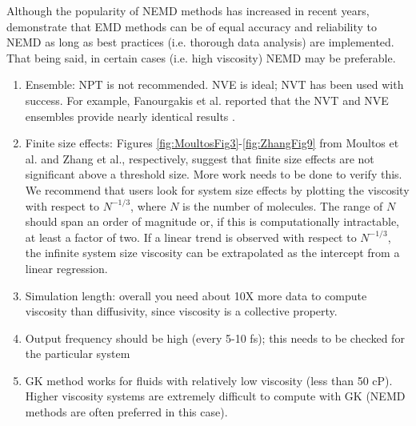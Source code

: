 \documentclass[9pt]{livecoms}
\begin{document}

Although the popularity of NEMD methods has increased in recent years, \cite{Chen2009} demonstrate that EMD methods can be of equal accuracy and reliability to NEMD as long as best practices (i.e. thorough data analysis) are implemented. That being said, in certain cases (i.e. high viscosity) NEMD may be preferable.

\begin{enumerate}
	\item Ensemble: NPT is not recommended. NVE is ideal; NVT has been used with success. For example, Fanourgakis et al. reported that the NVT and NVE ensembles provide nearly identical results \cite{Fanourgakis2012}.
	\item Finite size effects: Figures \ref{fig:MoultosFig3}-\ref{fig:ZhangFig9} from Moultos et al. and Zhang et al., respectively, suggest that finite size effects are not significant above a threshold size. More work needs to be done to verify this. We recommend that users look for system size effects by plotting the viscosity with respect to $N^{-1/3}$, where $N$ is the number of molecules. The range of $N$ should span an order of magnitude or, if this is computationally intractable, at least a factor of two. If a linear trend is observed with respect to $N^{-1/3}$, the infinite system size viscosity can be extrapolated as the intercept from a linear regression.
	\item Simulation length: overall you need about 10X more data to compute viscosity than diffusivity, since viscosity is a collective property.
	\item Output frequency should be high (every 5-10 fs); this needs to be checked for the particular system 
	\item GK method works for fluids with relatively low viscosity (less than 50 cP). Higher viscosity systems are extremely difficult to compute with GK (NEMD methods are often preferred in this case).

\end{enumerate}
\end{document}
